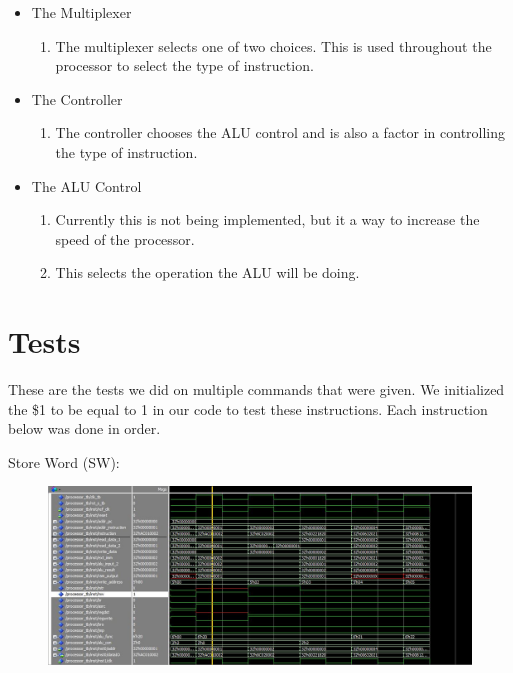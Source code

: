 \documentclass[paper=letter, fontsize=11pt]{scrartcl} %
\numberwithin{equation}{section}
\numberwithin{figure}{section}
\numberwithin{table}{section}
\begin{document}
\begin{itemize}
	\item The Multiplexer
	\begin{enumerate}
		\item The multiplexer selects one of two choices. This is used throughout the processor to select the type of instruction.
	\end{enumerate}
	\item The Controller
	\begin{enumerate}
		\item The controller chooses the ALU control and is also a factor in controlling the type of instruction.
	\end{enumerate}
	\item The ALU Control
		\begin{enumerate}
		\item Currently this is not being implemented, but it a way to increase the speed of the processor.
		\item This selects the operation the ALU will be doing.
	\end{enumerate}
\end{itemize}

\pagebreak


\section{Tests}
\begin{center}
These are the tests we did on multiple commands that were given. We initialized the \$1 to be equal to 1 in our code to test these instructions. Each instruction below was done in order.
\end{center}
Store Word (SW):

\begin{figure}[H]
	\centering
		\includegraphics[width=150mm]{../sim/photo/sw.JPG}
	\label{fig:sw}
\end{figure}
\end{document}
